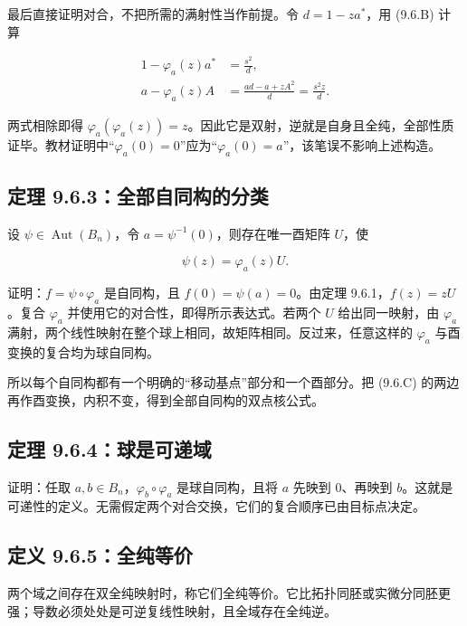 \documentclass[11pt,a4paper]{article}
\begin{document}
最后直接证明对合，不把所需的满射性当作前提。令 \(d=1-za^*\)，用 (9.6.B)
计算

\[
\begin{aligned}
1-\varphi_a(z)a^*&=\frac{s^2}{d},\\
a-\varphi_a(z)A
&=\frac{ad-a+zA^2}{d}
=\frac{s^2z}{d}.
\end{aligned}
\]

两式相除即得
\(\varphi_a(\varphi_a(z))=z\)。因此它是双射，逆就是自身且全纯，全部性质证毕。教材证明中``\(\varphi_a(0)=0\)''应为``\(\varphi_a(0)=a\)''，该笔误不影响上述构造。

\subsection{定理 9.6.3：全部自同构的分类}\label{ch09-s6-heading-5}

设 \(\psi\in\operatorname{Aut}(B_n)\)，令
\(a=\psi^{-1}(0)\)，则存在唯一酉矩阵 \(U\)，使

\[
\psi(z)=\varphi_a(z)U.
\]

证明：\(f=\psi\circ\varphi_a\) 是自同构，且 \(f(0)=\psi(a)=0\)。由定理
9.6.1，\(f(z)=zU\)。复合 \(\varphi_a\)
并使用它的对合性，即得所示表达式。若两个 \(U\) 给出同一映射，由
\(\varphi_a\)
满射，两个线性映射在整个球上相同，故矩阵相同。反过来，任意这样的
\(\varphi_a\) 与酉变换的复合均为球自同构。

所以每个自同构都有一个明确的``移动基点''部分和一个酉部分。把 (9.6.C)
的两边再作酉变换，内积不变，得到全部自同构的双点核公式。

\subsection{定理 9.6.4：球是可递域}\label{ch09-s6-heading-6}

证明：任取 \(a,b\in B_n\)，\(\varphi_b\circ\varphi_a\) 是球自同构，且将
\(a\) 先映到 \(0\)、再映到
\(b\)。这就是可递性的定义。无需假定两个对合交换，它们的复合顺序已由目标点决定。

\subsection{定义 9.6.5：全纯等价}\label{ch09-s6-heading-7}

两个域之间存在双全纯映射时，称它们全纯等价。它比拓扑同胚或实微分同胚更强；导数必须处处是可逆复线性映射，且全域存在全纯逆。

\end{document}
